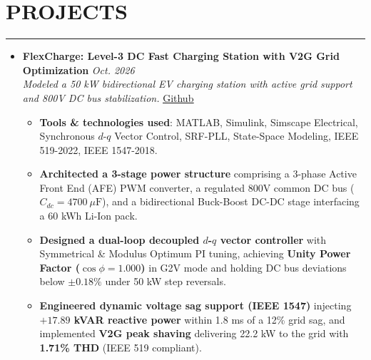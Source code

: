 
\section*{PROJECTS}
\vspace{-4pt}
\hrule
\vspace{6pt}

\begin{itemize}[leftmargin=12pt, label=\textbullet]

    \item \textbf{FlexCharge: Level-3 DC Fast Charging Station with V2G Grid Optimization} \hfill \textit{Oct. 2026} \\
    \textit{Modeled a 50 kW bidirectional EV charging station with active grid support and 800V DC bus stabilization.} \hfill \href{https://github.com/rakshitsh45/FlexCharge}{\underline{Github}}
    \begin{itemize}[leftmargin=15pt, label=-]
        \item \textbf{Tools \& technologies used}: MATLAB, Simulink, Simscape Electrical, Synchronous $d$-$q$ Vector Control, SRF-PLL, State-Space Modeling, IEEE 519-2022, IEEE 1547-2018.
        \item \textbf{Architected a 3-stage power structure} comprising a 3-phase Active Front End (AFE) PWM converter, a regulated 800V common DC bus ($C_{dc} = 4700\ \mu\text{F}$), and a bidirectional Buck-Boost DC-DC stage interfacing a 60 kWh Li-Ion pack.
        \item \textbf{Designed a dual-loop decoupled $d$-$q$ vector controller} with Symmetrical \& Modulus Optimum PI tuning, achieving \textbf{Unity Power Factor ($\cos\phi = 1.000$)} in G2V mode and holding DC bus deviations below $\pm 0.18\%$ under 50 kW step reversals.
        \item \textbf{Engineered dynamic voltage sag support (IEEE 1547)} injecting \textbf{$+17.89$ kVAR reactive power} within 1.8 ms of a 12\% grid sag, and implemented \textbf{V2G peak shaving} delivering 22.2 kW to the grid with \textbf{1.71\% THD} (IEEE 519 compliant).
    \end{itemize}

\end{itemize}
